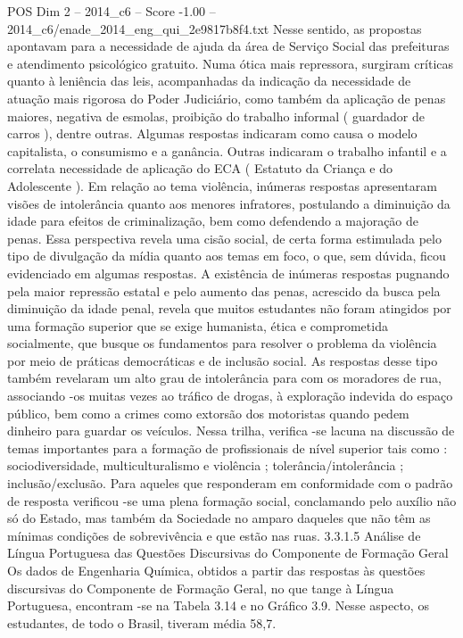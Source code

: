 \begin{textsample}{POS Dim 2 – 2014\_c6 – Score -1.00 – 2014\_c6/enade\_2014\_eng\_qui\_2e9817b8f4.txt}
Nesse sentido, as propostas apontavam para a necessidade de ajuda da área de Serviço Social das prefeituras e atendimento psicológico gratuito.
Numa ótica mais repressora, surgiram críticas quanto à leniência das leis, acompanhadas da indicação da necessidade de atuação mais rigorosa do Poder Judiciário, como também da aplicação de penas maiores, negativa de esmolas, proibição do trabalho informal ( guardador de carros ), dentre outras.
Algumas respostas indicaram como causa o modelo capitalista, o consumismo e a ganância.
Outras indicaram o trabalho infantil e a correlata necessidade de aplicação do ECA ( Estatuto da Criança e do Adolescente ).
Em relação ao tema violência, inúmeras respostas apresentaram visões de intolerância quanto aos menores infratores, postulando a diminuição da idade para efeitos de criminalização, bem como defendendo a majoração de penas.
Essa perspectiva revela uma cisão social, de certa forma estimulada pelo tipo de divulgação da mídia quanto aos temas em foco, o que, sem dúvida, ficou evidenciado em algumas respostas.
A existência de inúmeras respostas pugnando pela maior repressão estatal e pelo aumento das penas, acrescido da busca pela diminuição da idade penal, revela que muitos estudantes não foram atingidos por uma formação superior que se exige humanista, ética e comprometida socialmente, que busque os fundamentos para resolver o problema da violência por meio de práticas democráticas e de inclusão social.
As respostas desse tipo também revelaram um alto grau de intolerância para com os moradores de rua, associando -os muitas vezes ao tráfico de drogas, à exploração indevida do espaço público, bem como a crimes como extorsão dos motoristas quando pedem dinheiro para guardar os veículos.
Nessa trilha, verifica -se lacuna na discussão de temas importantes para a formação de profissionais de nível superior tais como : sociodiversidade, multiculturalismo e violência ; tolerância/intolerância ; inclusão/exclusão.
Para aqueles que responderam em conformidade com o padrão de resposta verificou -se uma plena formação social, conclamando pelo auxílio não só do Estado, mas também da Sociedade no amparo daqueles que não têm as mínimas condições de sobrevivência e que estão nas ruas. 3.3.1.5 Análise de Língua Portuguesa das Questões Discursivas do Componente de Formação Geral Os dados de Engenharia Química, obtidos a partir das respostas às questões discursivas do Componente de Formação Geral, no que tange à Língua Portuguesa, encontram -se na Tabela 3.14 e no Gráfico 3.9.
Nesse aspecto, os estudantes, de todo o Brasil, tiveram média 58,7.

\end{textsample}
